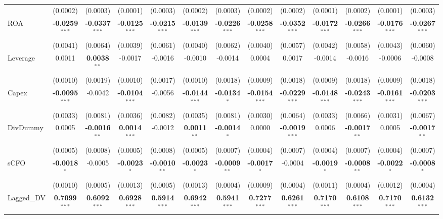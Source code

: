 \documentclass[11pt,a4paper]{article}
\begin{document}
\begin{table}[htbp]
\begin{tabular}{lcccccccccccc}
 & (0.0002) & (0.0003) & (0.0001) & (0.0003) & (0.0002) & (0.0003) & (0.0002) & (0.0002) & (0.0001) & (0.0002) & (0.0001) & (0.0003) \\
ROA & \textbf{-0.0259}$^{***}$ & \textbf{-0.0337}$^{***}$ & \textbf{-0.0125}$^{***}$ & \textbf{-0.0215}$^{***}$ & \textbf{-0.0139}$^{***}$ & \textbf{-0.0226}$^{***}$ & \textbf{-0.0258}$^{***}$ & \textbf{-0.0352}$^{***}$ & \textbf{-0.0172}$^{***}$ & \textbf{-0.0266}$^{***}$ & \textbf{-0.0176}$^{***}$ & \textbf{-0.0267}$^{***}$ \\
 & (0.0041) & (0.0064) & (0.0039) & (0.0061) & (0.0040) & (0.0062) & (0.0040) & (0.0057) & (0.0042) & (0.0058) & (0.0043) & (0.0060) \\
Leverage & 0.0011 & \textbf{0.0038}$^{**}$ & -0.0017 & -0.0016 & -0.0010 & -0.0014 & 0.0004 & 0.0017 & -0.0014 & -0.0016 & -0.0006 & -0.0008 \\
 & (0.0010) & (0.0019) & (0.0010) & (0.0017) & (0.0010) & (0.0018) & (0.0009) & (0.0018) & (0.0009) & (0.0018) & (0.0009) & (0.0018) \\
Capex & \textbf{-0.0095}$^{***}$ & -0.0042 & \textbf{-0.0104}$^{***}$ & -0.0056 & \textbf{-0.0144}$^{***}$ & \textbf{-0.0134}$^{*}$ & \textbf{-0.0154}$^{***}$ & \textbf{-0.0229}$^{***}$ & \textbf{-0.0148}$^{***}$ & \textbf{-0.0243}$^{***}$ & \textbf{-0.0161}$^{***}$ & \textbf{-0.0203}$^{***}$ \\
 & (0.0033) & (0.0081) & (0.0036) & (0.0082) & (0.0035) & (0.0081) & (0.0030) & (0.0064) & (0.0033) & (0.0066) & (0.0031) & (0.0067) \\
DivDummy & 0.0005 & \textbf{-0.0016}$^{**}$ & \textbf{0.0014}$^{***}$ & -0.0012 & \textbf{0.0011}$^{**}$ & \textbf{-0.0014}$^{*}$ & 0.0000 & \textbf{-0.0019}$^{***}$ & 0.0006 & \textbf{-0.0017}$^{**}$ & 0.0005 & \textbf{-0.0017}$^{**}$ \\
 & (0.0005) & (0.0008) & (0.0005) & (0.0008) & (0.0005) & (0.0007) & (0.0004) & (0.0007) & (0.0004) & (0.0007) & (0.0004) & (0.0007) \\
sCFO & \textbf{-0.0018}$^{*}$ & -0.0005 & \textbf{-0.0023}$^{*}$ & \textbf{-0.0010}$^{**}$ & \textbf{-0.0023}$^{*}$ & \textbf{-0.0009}$^{**}$ & \textbf{-0.0017}$^{*}$ & -0.0004 & \textbf{-0.0019}$^{*}$ & \textbf{-0.0008}$^{**}$ & \textbf{-0.0022}$^{*}$ & \textbf{-0.0008}$^{*}$ \\
 & (0.0010) & (0.0005) & (0.0013) & (0.0005) & (0.0013) & (0.0004) & (0.0009) & (0.0004) & (0.0011) & (0.0004) & (0.0012) & (0.0004) \\
Lagged\_DV & \textbf{0.7099}$^{***}$ & \textbf{0.6092}$^{***}$ & \textbf{0.6928}$^{***}$ & \textbf{0.5914}$^{***}$ & \textbf{0.6942}$^{***}$ & \textbf{0.5941}$^{***}$ & \textbf{0.7277}$^{***}$ & \textbf{0.6261}$^{***}$ & \textbf{0.7170}$^{***}$ & \textbf{0.6108}$^{***}$ & \textbf{0.7170}$^{***}$ & \textbf{0.6132}$^{***}$ \\

\end{tabular}
\end{table}
\end{document}
